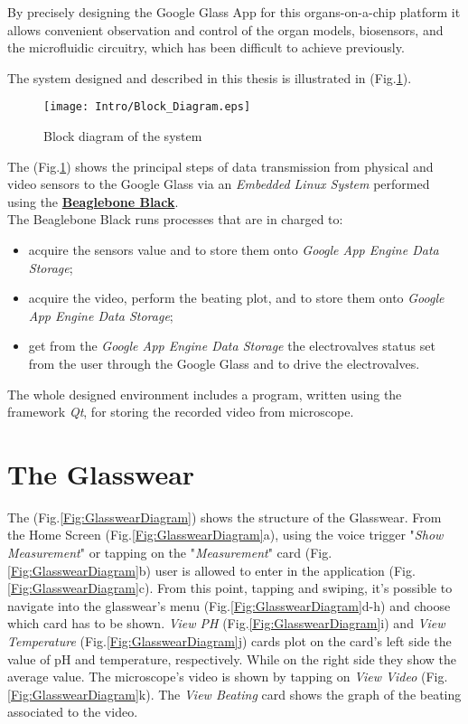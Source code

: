 By precisely designing the Google Glass App for this organs-on-a-chip platform it allows convenient observation and control of the organ models, biosensors, and the microfluidic circuitry, which has been difficult to achieve previously.

The system designed and described in this thesis is illustrated in (Fig.\ref{Fig:BlockDiagram}).
 
 \begin{figure}[h]
 	\centering
 	\texttt{[image: Intro/Block\_Diagram.eps]}
 	\caption{Block diagram of the system}
 	\label{Fig:BlockDiagram}
 	
 \end{figure}
 
 The (Fig.\ref{Fig:BlockDiagram}) shows the principal steps of data transmission from physical and video sensors to the Google Glass via an \textit{Embedded Linux System} performed using the \href{http://beagleboard.org/BLACK}{\textbf{Beaglebone Black}}.\\
 The Beaglebone Black runs processes that are in charged to:
 \begin{itemize}
 	\item acquire the sensors value and to store them onto \textit{Google App Engine Data Storage};
 	\item acquire the video, perform the beating plot, and to store them onto \textit{Google App Engine Data Storage};
 	\item get from the \textit{Google App Engine Data Storage} the electrovalves status set from the user through the Google Glass and to drive the electrovalves.
 \end{itemize} 
 
 The whole designed environment includes a program, written using the framework \textit{Qt}, for storing the recorded video from microscope.
 
 \section*{The Glasswear}
 The (Fig.\ref{Fig:GlasswearDiagram}) shows the structure of the Glasswear. From the Home Screen (Fig.\ref{Fig:GlasswearDiagram}a), using the voice trigger "\textit{Show Measurement}" or tapping on the "\textit{Measurement}" card (Fig.\ref{Fig:GlasswearDiagram}b) user is allowed to enter in the application (Fig.\ref{Fig:GlasswearDiagram}c). From this point, tapping and swiping, it's possible to navigate into the glasswear's menu (Fig.\ref{Fig:GlasswearDiagram}d-h) and choose which card has to be shown. \textit{View PH} (Fig.\ref{Fig:GlasswearDiagram}i) and \textit{View Temperature} (Fig.\ref{Fig:GlasswearDiagram}j) cards  plot on the card's left side the value of pH and temperature, respectively. While on the right side they show the average value. The microscope's video is shown by tapping on \textit{View Video} (Fig.\ref{Fig:GlasswearDiagram}k). The \textit{View Beating} card shows the graph of the beating associated to the video.
 \\
 
